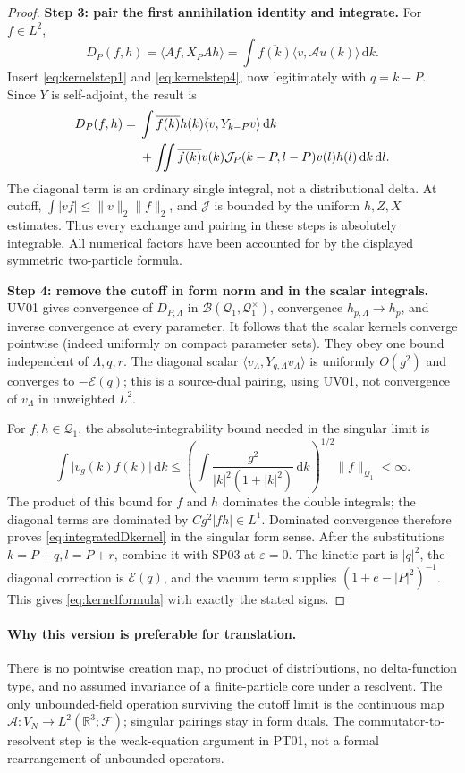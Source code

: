 \documentclass[11pt,a4paper]{article}
\theoremstyle{remark}\newtheorem{remark}[theorem]{Remark}
\newcommand{\R}{\mathbb R}\newcommand{\C}{\mathbb C}\newcommand{\N}{\mathbb N}
\newcommand{\F}{\mathcal F}\newcommand{\Q}{\mathcal Q}\newcommand{\HH}{\mathcal H}
\newcommand{\ip}[2]{\langle #1,#2\rangle}\newcommand{\norm}[1]{\lVert #1\rVert}
\newcommand{\abs}[1]{\lvert #1\rvert}\newcommand{\rankone}[2]{\lvert #1\rangle\langle #2\rvert}
\newcommand{\dd}{\,\mathrm d}\newcommand{\almosteverywhere}{\text{a.e.}}
\newcommand{\Ecal}{\mathcal E}
\begin{document}
\begin{proof}
\textbf{Step 3: pair the first annihilation identity and integrate.}
For $f\in L^2$,
\[
 D_P(f,h)=\ip{Af}{X_PAh}
        =\int\overline{f(k)}\ip v{\mathcal A u(k)}\dd k.
\]
Insert \eqref{eq:kernelstep1} and \eqref{eq:kernelstep4}, now legitimately with $q=k-P$. Since $Y$ is self-adjoint, the result is
\begin{align}
 D_P(f,h)={}&\int\overline{f(k)}h(k)\ip v{Y_{k-P}v}\dd k\notag\\
 &+\iint\overline{f(k)}v(k)\mathcal J_P(k-P,l-P)v(l)h(l)\dd k\dd l.
 \label{eq:integratedDkernel}
\end{align}
The diagonal term is an ordinary single integral, not a distributional delta. At cutoff, $\int\abs{vf}\leq\norm v_2\norm f_2$, and $\mathcal J$ is bounded by the uniform $h,Z,X$ estimates. Thus every exchange and pairing in these steps is absolutely integrable. All numerical factors have been accounted for by the displayed symmetric two-particle formula.

\textbf{Step 4: remove the cutoff in form norm and in the scalar integrals.}
UV01 gives convergence of $D_{P,\Lambda}$ in
$\mathcal B(\Q_1,\Q_1^{\times})$, convergence $h_{p,\Lambda}\to h_p$, and inverse convergence at every parameter. It follows that the scalar kernels converge pointwise (indeed uniformly on compact parameter sets). They obey one bound independent of $\Lambda,q,r$. The diagonal scalar $\ip{v_\Lambda}{Y_{q,\Lambda}v_\Lambda}$ is uniformly $O(g^2)$ and converges to $-\Ecal(q)$; this is a source-dual pairing, using UV01, not convergence of $v_\Lambda$ in unweighted $L^2$.

For $f,h\in\Q_1$, the absolute-integrability bound needed in the singular limit is
\[
 \int\abs{v_g(k)f(k)}\dd k
 \leq\left(\int\frac{g^2}{\abs k^2(1+\abs k^2)}\dd k\right)^{1/2}
          \norm f_{\Q_1}<\infty.
\]
The product of this bound for $f$ and $h$ dominates the double integrals; the diagonal terms are dominated by $C g^2\abs{fh}\in L^1$. Dominated convergence therefore proves \eqref{eq:integratedDkernel} in the singular form sense. After the substitutions $k=P+q,l=P+r$, combine it with SP03 at $\varepsilon=0$. The kinetic part is $\abs q^2$, the diagonal correction is $\Ecal(q)$, and the vacuum term supplies $(1+e-\abs P^2)^{-1}$. This gives \eqref{eq:kernelformula} with exactly the stated signs.
\end{proof}
\paragraph{Why this version is preferable for translation.}
There is no pointwise creation map, no product of distributions, no delta-function type, and no assumed invariance of a finite-particle core under a resolvent. The only unbounded-field operation surviving the cutoff limit is the continuous map $\mathcal A:V_N\to L^2(\R^3;\F)$; singular pairings stay in form duals. The commutator-to-resolvent step is the weak-equation argument in PT01, not a formal rearrangement of unbounded operators.
\end{document}
